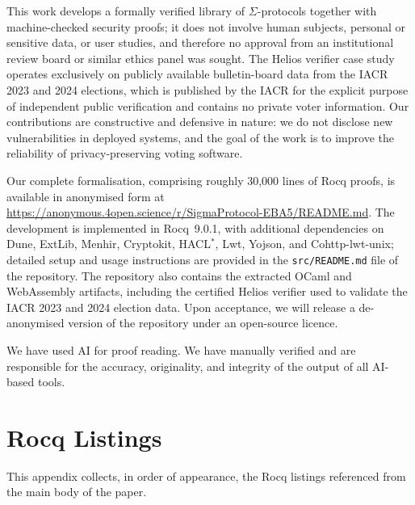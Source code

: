 \documentclass[sigconf,anonymous,review]{acmart}
\begin{document}
\begin{ethics}
This work develops a formally verified library of $\Sigma$-protocols together
with machine-checked security proofs; it does not involve human subjects,
personal or sensitive data, or user studies, and therefore no approval from an
institutional review board or similar ethics panel was sought. The Helios
verifier case study operates exclusively on publicly available
bulletin-board data from the IACR 2023 and 2024 elections, which is published
by the IACR for the explicit purpose of independent public verification and
contains no private voter information. Our contributions are constructive and
defensive in nature: we do not disclose new vulnerabilities in deployed
systems, and the goal of the work is to improve the reliability of
privacy-preserving voting software.
\end{ethics}

\begin{openscience}
Our complete formalisation, comprising roughly 30,000 lines of Rocq proofs, is
available in anonymised form at
\url{https://anonymous.4open.science/r/SigmaProtocol-EBA5/README.md}. The
development is implemented in Rocq~9.0.1, with additional dependencies on
Dune, ExtLib, Menhir, Cryptokit, HACL$^{*}$, Lwt, Yojson, and Cohttp-lwt-unix;
detailed setup and usage instructions are provided in the
\texttt{src/README.md} file of the repository. The repository also contains
the extracted OCaml and WebAssembly artifacts, including the certified Helios
verifier used to validate the IACR 2023 and 2024 election data. Upon
acceptance, we will release a de-anonymised version of the repository under an
open-source licence.
\end{openscience}

\begin{ai}
We have used AI for proof reading. We have manually verified
and are responsible for the accuracy, originality, and integrity of the
output of all AI-based tools.
\end{ai}




\section{Rocq Listings}\label{appendix_listings}
This appendix collects, in order of appearance, the Rocq listings referenced from the main body of the paper.
\end{document}
